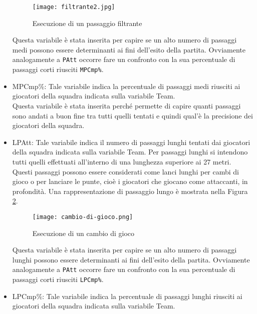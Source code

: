 \begin{itemize}
	\begin{figure}[ht]
		\begin{center}
			\texttt{[image: filtrante2.jpg]}
			\caption{Esecuzione di un passaggio filtrante} \label{fig:filt}
		\end{center}
	\end{figure}

	Questa variabile è stata inserita per capire se un alto numero di passaggi medi possono essere determinanti ai fini dell'esito della partita. Ovviamente analogamente a \texttt{PAtt} occorre fare un confronto con la sua percentuale di passaggi corti riusciti \texttt{MPCmp\%}.

	\item \textsf{MPCmp\%}: Tale variabile indica la percentuale di passaggi medi riusciti ai giocatori della squadra indicata sulla variabile \textsf{Team}.\\ Questa variabile è stata inserita perché permette di capire quanti passaggi sono andati a buon fine tra tutti quelli tentati e quindi qual'è la precisione dei giocatori della squadra.
	\item \textsf{LPAtt}: Tale variabile indica il numero di passaggi lunghi tentati dai giocatori della squadra indicata sulla variabile \textsf{Team}. Per passaggi lunghi si intendono tutti quelli effettuati all'interno di una lunghezza superiore ai 27 metri. Questi passaggi possono essere considerati come lanci lunghi per cambi di gioco o per lanciare le punte, cioè i giocatori che giocano come attaccanti, in profondità. Una rappresentazione di passaggio lungo è mostrata nella Figura \ref{fig:cambio}.
	\begin{figure}[ht]
		\begin{center}
			\texttt{[image: cambio-di-gioco.png]}
			\caption{Esecuzione di un cambio di gioco} \label{fig:cambio}
		\end{center}
	\end{figure}
	
	Questa variabile è stata inserita per capire se un alto numero di passaggi lunghi possono essere determinanti ai fini dell'esito della partita. Ovviamente analogamente a \texttt{PAtt} occorre fare un confronto con la sua percentuale di passaggi corti riusciti \texttt{LPCmp\%}.

	\item \textsf{LPCmp\%}: Tale variabile indica la percentuale di passaggi lunghi riusciti ai giocatori della squadra indicata sulla variabile \textsf{Team}. 
	

\end{itemize}
